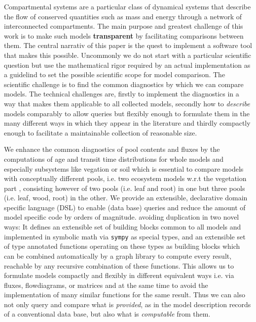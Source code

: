
Compartmental systems are a particular class of dynamical systems that describe
the flow of conserved quantities such as mass and energy through a network of
interconnected compartments. 
The main purpose and greatest challenge of this
work is to make such models {\bf transparent} by facilitating comparisons
between them. 
The central narrativ of this paper is the quest to implement a software tool that makes this possible. 
Uncommonly we do not start with a particular scientific question but use the mathematical rigor required by an actual implementation as a guidelind to set the possible scientific scope for model comparison.
The scientific challenge is to find the common
diagnostics by which we can compare models. The technical challenges are,
firstly to implement the diagnostics in a way that makes them applicable to all collected
models, secondly how to \emph{describe} models comparably to allow queries but flexibly enough 
to formulate them in the many different
ways in which they appear in the literature and thirdly compactly enough to facilitate a maintainable collection of reasonable size. 

We enhance the common diagnostics of pool contents and fluxes by the 
computations of age and transit time distributions for whole models and
especially subsystems like vegation or soil which is essential 
to compare models with conceptually different pools, i.e. two ecosystem models
w.r.t the vegetation part , consisting however of two pools
(i.e. leaf and root) in one but three pools (i.e. leaf, wood, root) in the
other. 
We provide an extensible, declarative domain specific language (DSL) to enable (data base) queries and reduce the amount of model specific code by orders of magnitude. 
avoiding duplication in two novel ways: It defines an extensible set of 
building blocks common to all models and implemented in symbolic math via \texttt{sympy} as special types, and an extensible set of type annotated functions operating on these types as 
building blocks which can be combined automatically by a graph library to compute every result,
reachable by any recursive combination of these functions. 
This allows us to formulate models compactly and
flexibly in different equivalent ways i.e. via fluxes, flowdiagrams, or
matrices and at the same time to avoid the implementation of many similar
functions for the same result. Thus we can also not only query and compare
what is \emph{provided}, as in the model description records of a conventional data
base, but also what is \emph{computable} from them. 

